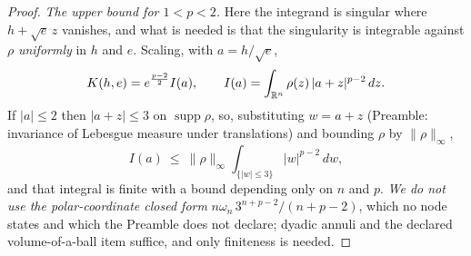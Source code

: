 \begin{proof}
\emph{The upper bound for $1<p<2$.}  Here the integrand is singular where
$h+\sqrt e\,z$ vanishes, and what is needed is that the singularity is
integrable against $\rho$ \emph{uniformly} in $h$ and $e$.  Scaling, with
$a=h/\sqrt e$,
\[
K(h,e)=e^{\frac{p-2}2}I(a),
\qquad
I(a)=\int_{\mathbb{R}^n}\rho(z)\,|a+z|^{p-2}\,dz .
\]
If $|a|\le2$ then $|a+z|\le3$ on $\operatorname{supp}\rho$, so, substituting
$w=a+z$ (Preamble: invariance of Lebesgue measure under translations) and
bounding $\rho$ by $\|\rho\|_\infty$,
\[
I(a)\ \le\ \|\rho\|_\infty\int_{\{|w|\le3\}}|w|^{p-2}\,dw ,
\]
and that integral is finite with a bound depending only on $n$ and $p$.
\emph{We do not use the polar-coordinate closed form} $n\omega_n\,3^{n+p-2}/(n+p-2)$,
which no node states and which the Preamble does not declare; dyadic annuli and
the declared volume-of-a-ball item suffice, and only finiteness is needed.


\end{proof}
